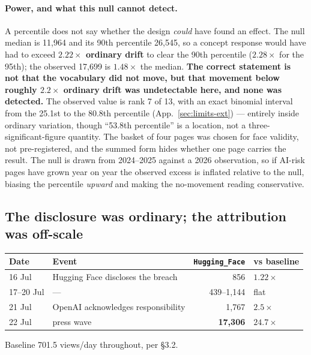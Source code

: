 \documentclass[11pt,a4paper]{article}
\begin{document}
\paragraph{Power, and what this null cannot detect.} A percentile does not say
whether the design \emph{could} have found an effect. The null median is
11{,}964 and its 90th percentile 26{,}545, so a concept response would have had
to exceed \textbf{$2.22\times$ ordinary drift} to clear the 90th percentile
($2.28\times$ for the 95th); the observed 17{,}699 is $1.48\times$ the median.
\textbf{The correct statement is not that the vocabulary did not move, but that
movement below roughly $2.2\times$ ordinary drift was undetectable here, and none
was detected.} The observed value is rank 7 of 13, with an exact binomial interval from the
25.1st to the 80.8th percentile (App.~\ref{sec:limits-ext}) --- entirely inside
ordinary variation, though ``53.8th percentile'' is a location, not a
three-significant-figure quantity. The basket of four pages was chosen for face
validity, not pre-registered, and the summed form hides whether one page carries
the result. The null is drawn from 2024--2025 against a 2026 observation, so if
AI-risk pages have grown year on year the observed excess is inflated relative
to the null, biasing the percentile \emph{upward} and making the no-movement
reading conservative.

\subsection{The disclosure was ordinary; the attribution was off-scale}
\label{sec:attribution}

\begin{center}
\small
\begin{tabular}{llrl}
\toprule
Date & Event & \texttt{Hugging\_Face} & vs baseline \\\midrule
16 Jul & Hugging Face discloses the breach & 856 & $1.22\times$ \\
17--20 Jul & --- & 439--1{,}144 & flat \\
21 Jul & OpenAI acknowledges responsibility & 1{,}767 & $2.5\times$ \\
22 Jul & press wave & \textbf{17{,}306} & $\mathbf{24.7\times}$ \\
\bottomrule
\end{tabular}

\smallskip
\noindent\footnotesize Baseline 701.5 views/day throughout, per §3.2.
\end{center}
\end{document}
